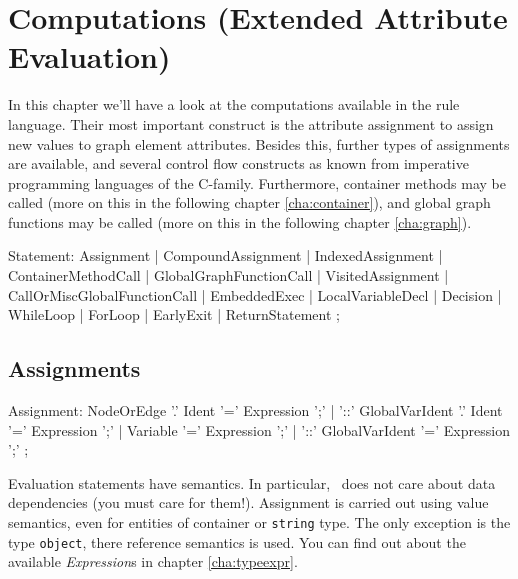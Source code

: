 \chapter{Computations (Extended Attribute Evaluation)}
\label{cha:computations}

In this chapter we'll have a look at the computations available in the rule language.
Their most important construct is the attribute assignment to assign new values to graph element attributes.
Besides this, further types of assignments are available, and several control flow constructs as known from imperative programming languages of the C-family.
Furthermore, container methods may be called (more on this in the following chapter \ref{cha:container}), 
and global graph functions may be called (more on this in the following chapter \ref{cha:graph}).

\begin{rail}
  Statement:
      Assignment
    | CompoundAssignment
    | IndexedAssignment
    | ContainerMethodCall
    | GlobalGraphFunctionCall
    | VisitedAssignment
    | CallOrMiscGlobalFunctionCall
    | EmbeddedExec
    | LocalVariableDecl
    | Decision
    | WhileLoop
    | ForLoop
    | EarlyExit
    | ReturnStatement
    ;
\end{rail}\label{computationstatemet}



\section{Assignments} \label{sub:assignments}

\begin{rail}
  Assignment:
	  NodeOrEdge '.' Ident '=' Expression ';' |
	  '::' GlobalVarIdent '.' Ident '=' Expression ';' |
	  Variable '=' Expression ';' |
	  '::' GlobalVarIdent '=' Expression ';'
	;
\end{rail}

Evaluation statements have  semantics.
In particular, \GrG\ does not care about data dependencies (you must care for them!).
Assignment is carried out using value semantics, even for entities of container or \texttt{string} type.
The only exception is the type \texttt{object}, there reference semantics is used.
You can find out about the available \emph{Expression}s in chapter \ref{cha:typeexpr}.

